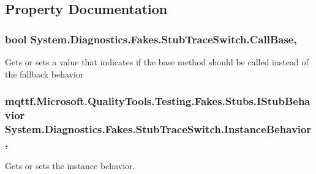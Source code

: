 \subsection{Property Documentation}
\hypertarget{class_system_1_1_diagnostics_1_1_fakes_1_1_stub_trace_switch_a6fe8150e5b3a3ad882b80f6dfc873fe1}{
\subsubsection[{Call\-Base}]{\setlength{\rightskip}{0pt plus 5cm}bool System.\-Diagnostics.\-Fakes.\-Stub\-Trace\-Switch.\-Call\-Base\hspace{0.3cm}{\ttfamily [get]}, {\ttfamily [set]}}}\label{class_system_1_1_diagnostics_1_1_fakes_1_1_stub_trace_switch_a6fe8150e5b3a3ad882b80f6dfc873fe1}


Gets or sets a value that indicates if the base method should be called instead of the fallback behavior

\hypertarget{class_system_1_1_diagnostics_1_1_fakes_1_1_stub_trace_switch_a6042ddda4869dc205d83eb67c82da5aa}{
\subsubsection[{Instance\-Behavior}]{\setlength{\rightskip}{0pt plus 5cm}mqttf.\-Microsoft.\-Quality\-Tools.\-Testing.\-Fakes.\-Stubs.\-I\-Stub\-Behavior System.\-Diagnostics.\-Fakes.\-Stub\-Trace\-Switch.\-Instance\-Behavior\hspace{0.3cm}{\ttfamily [get]}, {\ttfamily [set]}}}\label{class_system_1_1_diagnostics_1_1_fakes_1_1_stub_trace_switch_a6042ddda4869dc205d83eb67c82da5aa}


Gets or sets the instance behavior.

